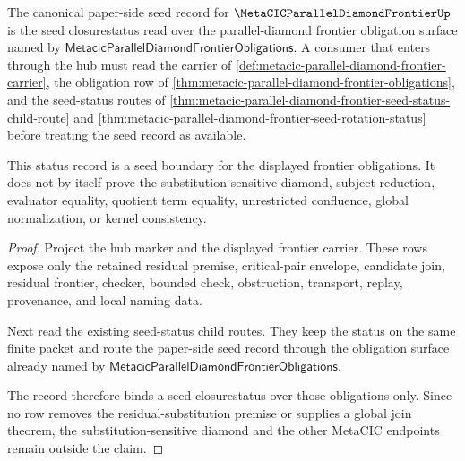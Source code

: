 \begin{theorem}
\label{thm:metacic-parallel-diamond-frontier-status-canonical}
The canonical paper-side seed record for $\MetaCICParallelDiamondFrontierUp$ is the seed closurestatus read over the parallel-diamond frontier obligation surface named by $\mathsf{MetacicParallelDiamondFrontierObligations}$. A consumer that enters through the hub must read the carrier of \autoref{def:metacic-parallel-diamond-frontier-carrier}, the obligation row of \autoref{thm:metacic-parallel-diamond-frontier-obligations}, and the seed-status routes of \autoref{thm:metacic-parallel-diamond-frontier-seed-status-child-route} and \autoref{thm:metacic-parallel-diamond-frontier-seed-rotation-status} before treating the seed record as available.

This status record is a seed boundary for the displayed frontier obligations. It does not by itself prove the substitution-sensitive diamond, subject reduction, evaluator equality, quotient term equality, unrestricted confluence, global normalization, or kernel consistency.
\end{theorem}
\begin{proof}
Project the hub marker and the displayed frontier carrier. These rows expose only the retained residual premise, critical-pair envelope, candidate join, residual frontier, checker, bounded check, obstruction, transport, replay, provenance, and local naming data.

Next read the existing seed-status child routes. They keep the status on the same finite packet and route the paper-side seed record through the obligation surface already named by $\mathsf{MetacicParallelDiamondFrontierObligations}$.

The record therefore binds a seed closurestatus over those obligations only. Since no row removes the residual-substitution premise or supplies a global join theorem, the substitution-sensitive diamond and the other MetaCIC endpoints remain outside the claim.
\end{proof}
